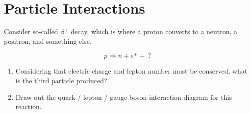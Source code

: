 \section{Particle Interactions}

\makelabheader %

\bigskip

Consider so-called $\beta^+$ decay, which is where a proton converts to a neutron, a positron, and something else. 

$$p \Longrightarrow n + e^+ + \ ?$$

\begin{enumerate}[wide]
\item Considering that electric charge and lepton number must be conserved, what is the third particle produced?
\answerspace{1.5in}

\item Draw out the quark / lepton / gauge boson interaction diagram for this reaction.
\answerspace{2.7in}

\end{enumerate}
